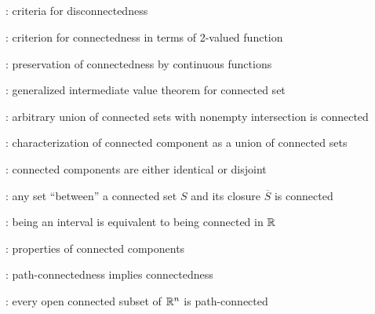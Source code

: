 \subsection*{}
\item {}: criteria for disconnectedness
\item {}: criterion for connectedness in terms of 2-valued function
\item {}: preservation of connectedness by continuous functions
\item {}: generalized intermediate value theorem for connected set
\item {}: arbitrary union of connected sets with nonempty intersection is connected
\item {}: characterization of connected component as a union of connected sets
\item {}: connected components are either identical or disjoint
\item {}: any set ``between'' a connected set \(S\) and its closure \(\overline{S}\) is connected
\item {}: being an interval is equivalent to being connected in \(\mathbb{R}\)
\item {}: properties of connected components
\item {}: path-connectedness implies connectedness
\item {}: every open connected subset of \(\mathbb{R}^n\) is path-connected
